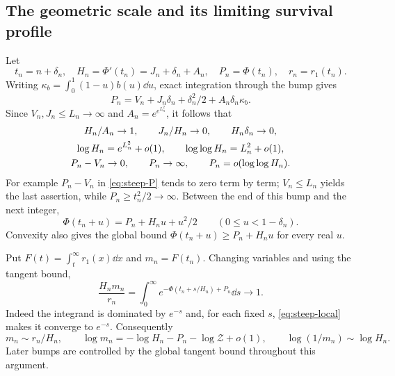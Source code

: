 \documentclass[11pt]{article}
\numberwithin{equation}{section}
\theoremstyle{remark}\newtheorem{remark}[theorem]{Remark}
\begin{document}
\subsection{The geometric scale and its limiting survival profile}
Let
\[
 t_n=n+\delta_n,\quad H_n=\Phi'(t_n)=J_n+\delta_n+A_n,
 \quad P_n=\Phi(t_n),\quad r_n=r_1(t_n).
\]
Writing $\kappa_b=\int_0^1(1-u)b(u)\dd u$, exact integration through the bump gives
\begin{equation}\label{eq:steep-P}
 P_n=V_n+J_n\delta_n+\delta_n^2/2+A_n\delta_n\kappa_b.
\end{equation}
Since $V_n,J_n\le L_n\to\infty$ and $A_n=e^{e^{L_n^2}}$, it follows that
\begin{gather}
 H_n/A_n\to1,\qquad J_n/H_n\to0,\qquad H_n\delta_n\to0,\notag\\
 \log H_n=e^{L_n^2}+o(1),\qquad\log\log H_n=L_n^2+o(1),\notag\\
 P_n-V_n\to0,\qquad P_n\to\infty,\qquad
 P_n=o(\log\log H_n).\label{eq:steep-limits}
\end{gather}
For example $P_n-V_n$ in \eqref{eq:steep-P} tends to zero term by term; $V_n\le L_n$ yields the last assertion, while $P_n\ge t_n^2/2\to\infty$. Between the end of this bump and the next integer,
\begin{equation}\label{eq:steep-local}
 \Phi(t_n+u)=P_n+H_nu+u^2/2\qquad(0\le u<1-\delta_n).
\end{equation}
Convexity also gives the global bound
$\Phi(t_n+u)\ge P_n+H_nu$ for every real $u$.

Put $F(t)=\int_t^\infty r_1(x)\dd x$ and $m_n=F(t_n)$. Changing variables and using the tangent bound,
\[
 \frac{H_nm_n}{r_n}
 =\int_0^\infty e^{-\Phi(t_n+s/H_n)+P_n}\dd s\longrightarrow1.
\]
Indeed the integrand is dominated by $e^{-s}$ and, for each fixed $s$, \eqref{eq:steep-local} makes it converge to $e^{-s}$. Consequently
\begin{equation}\label{eq:steep-mass}
 m_n\sim r_n/H_n,\qquad
 \log m_n=-\log H_n-P_n-\log\mathcal Z+o(1),\qquad
 \log(1/m_n)\sim\log H_n.
\end{equation}
Later bumps are controlled by the global tangent bound throughout this argument.
\end{document}
